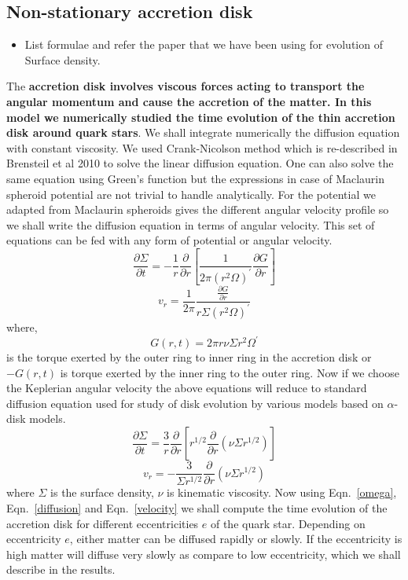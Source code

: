 \documentclass[useAMS,usenatbib]{mn2e}
\begin{document}
\subsection{Non-stationary accretion disk}
\begin{itemize}
\item List formulae and refer the paper that we have been using for
  evolution of Surface density. 
\end{itemize}
The \textbf{accretion disk involves viscous forces acting to transport the angular momentum and cause the accretion of the matter. In this model we numerically studied the time evolution of the thin accretion disk around quark stars}. We shall integrate numerically the diffusion equation with constant viscosity. We used Crank-Nicolson method which is re-described in Brensteil et al 2010 to solve the linear diffusion equation. One can also solve the same equation using Green's function but the expressions in case of Maclaurin spheroid potential are not trivial to handle analytically. For the potential we adapted from Maclaurin spheroids gives the different angular velocity profile so we shall write the diffusion equation in terms of angular velocity. This set of equations can be fed with any form of potential or angular velocity.
\begin{equation}
\frac{\partial\Sigma}{\partial t} = -\frac{1}{r}\frac{\partial}{\partial r}\left[\frac{1}{2\pi(r^2\Omega)^\prime}\frac{\partial G}{\partial r}\right]
\label{diffusion}
\end{equation}
\begin{equation}
v_r = \frac{1}{2\pi}\frac{\frac{\partial G}{\partial r}}{r\Sigma (r^2\Omega)^\prime}
\label{velocity}
\end{equation}
where,
\begin{equation}
G(r,t) = 2\pi r\nu\Sigma r^2 \Omega^\prime 
\end{equation}
is the torque exerted by the outer ring to inner ring in the accretion disk or $-G(r,t)$ is torque exerted by the inner ring to the outer ring. Now if we choose the Keplerian angular velocity the above equations will reduce to standard diffusion equation used for study of disk evolution by various models based on $\alpha$-disk models.
\begin{equation}
\frac{\partial\Sigma}{\partial t} = \frac{3}{r}\frac{\partial}{\partial r}\left[r^{1/2}\frac{\partial}{\partial r}\left(\nu\Sigma r^{1/2}\right)\right]
\end{equation}
\begin{equation}
v_r = -\frac{3}{\Sigma r^{1/2}}\frac{\partial}{\partial r}\left(\nu\Sigma r^{1/2}\right)
\end{equation}
where $\Sigma$ is the surface density, $\nu$ is kinematic viscosity. Now using Eqn.~\ref{omega}, Eqn.~\ref{diffusion} and Eqn.~\ref{velocity} we shall compute the time evolution of the accretion disk for different eccentricities $e$ of the quark star. Depending on eccentricity $e$, either matter can be diffused rapidly or slowly. If the eccentricity is high matter will diffuse very slowly as compare to low eccentricity, which we shall describe in the results.
\end{document}
